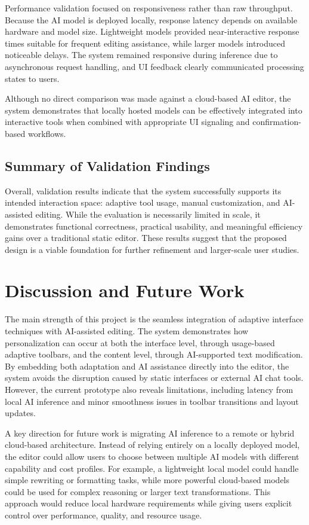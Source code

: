 \documentclass[sigconf]{acmart}
\begin{document}
Performance validation focused on responsiveness rather than raw throughput. Because the AI model is deployed locally, response latency depends on available hardware and model size. Lightweight models provided near-interactive response times suitable for frequent editing assistance, while larger models introduced noticeable delays. The system remained responsive during inference due to asynchronous request handling, and UI feedback clearly communicated processing states to users.

Although no direct comparison was made against a cloud-based AI editor, the system demonstrates that locally hosted models can be effectively integrated into interactive tools when combined with appropriate UI signaling and confirmation-based workflows.

\subsection{Summary of Validation Findings}

Overall, validation results indicate that the system successfully supports its intended interaction space: adaptive tool usage, manual customization, and AI-assisted editing. While the evaluation is necessarily limited in scale, it demonstrates functional correctness, practical usability, and meaningful efficiency gains over a traditional static editor. These results suggest that the proposed design is a viable foundation for further refinement and larger-scale user studies.

\section{Discussion and Future Work}

The main strength of this project is the seamless integration of adaptive interface techniques with AI-assisted editing. The system demonstrates how personalization can occur at both the interface level, through usage-based adaptive toolbars, and the content level, through AI-supported text modification. By embedding both adaptation and AI assistance directly into the editor, the system avoids the disruption caused by static interfaces or external AI chat tools. However, the current prototype also reveals limitations, including latency from local AI inference and minor smoothness issues in toolbar transitions and layout updates.

A key direction for future work is migrating AI inference to a remote or hybrid cloud-based architecture. Instead of relying entirely on a locally deployed model, the editor could allow users to choose between multiple AI models with different capability and cost profiles. For example, a lightweight local model could handle simple rewriting or formatting tasks, while more powerful cloud-based models could be used for complex reasoning or larger text transformations. This approach would reduce local hardware requirements while giving users explicit control over performance, quality, and resource usage.
\end{document}
